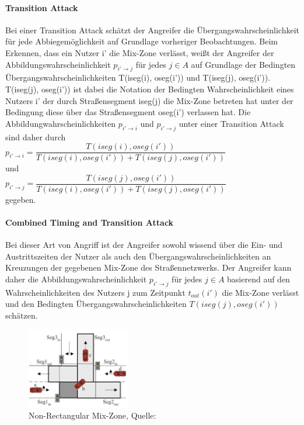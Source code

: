 \paragraph{Transition Attack} Bei einer Transition Attack schätzt der Angreifer die Übergangswahrscheinlichkeit für jede Abbiegemöglichkeit auf Grundlage vorheriger Beobachtungen. Beim Erkennen, dass ein Nutzer i' die Mix-Zone verlässt, weißt der Angreifer der Abbildungswahrscheinlichkeit $p_{i'\rightarrow j}$  für jedes $j \in A$ auf Grundlage der Bedingten Übergangswahrscheinlichkeiten T(iseg(i), oseg(i')) und T(iseg(j), oseg(i')).  T(iseg(j), oseg(i')) ist dabei die Notation der Bedingten Wahrscheinlichkeit eines Nutzers i' der durch Straßensegment iseg(j) die Mix-Zone betreten hat unter der Bedingung diese über das Straßensegment oseg(i') verlassen hat. Die Abbildungwahrscheinlichkeiten  $p_{i'\rightarrow i}$ und $p_{i'\rightarrow j}$ unter einer Transition Attack sind daher durch \\
$p_{i'\rightarrow i} = \dfrac{T(iseg(i), oseg(i'))}{T(iseg(i), oseg(i')) + T(iseg(j), oseg(i'))} $\\
und \\
$p_{i'\rightarrow j} = \dfrac{T(iseg(j), oseg(i'))}{T(iseg(i), oseg(i')) + T(iseg(j), oseg(i'))} $ \\ gegeben.

\paragraph{Combined  Timing and Transition Attack} Bei dieser Art von Angriff ist der Angreifer sowohl wissend über die Ein- und Austrittszeiten der Nutzer als auch den Übergangswahrscheinlichkeiten an Kreuzungen der gegebenen Mix-Zone des Straßennetzwerks. Der Angreifer kann  daher die Abbildungswahrscheinlichkeit $p_{i'\rightarrow j}$ für jedes $j \in A$ basierend auf den Wahrscheinlichkeiten des Nutzers j zum Zeitpunkt $t_{out}(i')$ die Mix-Zone verlässt und den Bedingten Übergangswahrscheinlichkeiten $T(iseg(j), oseg(i'))$ schätzen. 

\begin{figure}[!h]
	\centering
	\includegraphics[width=0.4\textwidth]{Bilder/nonrectangularMix.PNG}
	\caption{Non-Rectangular Mix-Zone, Quelle: \protect\cite{Chow2011}}
	\label{fig_MixSrasseNon}
\end{figure}

